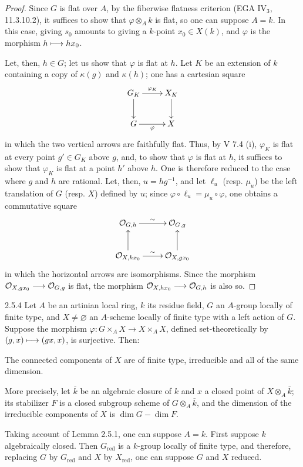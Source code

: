 \begin{proof}
Since $G$ is flat over $A$, by the fiberwise flatness criterion (EGA IV$_3$, 11.3.10.2), it suffices to show that $\varphi\otimes_Ak$ is flat, so one can suppose $A=k$. In this case, giving $s_0$ amounts to giving a $k$-point $x_0\in X(k)$, and $\varphi$ is the morphism $h\longmapsto hx_0$.

Let, then, $h\in G$; let us show that $\varphi$ is flat at $h$. Let $K$ be an extension of $k$ containing a copy of $\kappa(g)$ and $\kappa(h)$; one has a cartesian square
\[
\xymatrix{G_K\ar[r]^{\varphi_K}\ar[d]&X_K\ar[d]\\G\ar[r]_\varphi&X}
\]
in which the two vertical arrows are faithfully flat. Thus, by V 7.4 (i), $\varphi_K$ is flat at every point $g'\in G_K$ above $g$, and, to show that $\varphi$ is flat at $h$, it suffices to show that $\varphi_K$ is flat at a point $h'$ above $h$. One is therefore reduced to the case where $g$ and $h$ are rational. Let, then, $u=hg^{-1}$, and let $\ell_u$ (resp. $\mu_u$) be the left translation of $G$ (resp. $X$) defined by $u$; since $\varphi\circ\ell_u=\mu_u\circ\varphi$, one obtains a commutative square
\[
\xymatrix{\OO_{G,h}\ar[r]^\sim&\OO_{G,g}\\\OO_{X,hx_0}\ar[u]\ar[r]^\sim&\OO_{X,gx_0}\ar[u]}
\]
in which the horizontal arrows are isomorphisms. Since the morphism $\mathcal{O}_{X,gx_0}\longrightarrow\mathcal{O}_{G,g}$ is flat, the morphism $\mathcal{O}_{X,hx_0}\longrightarrow\mathcal{O}_{G,h}$ is also so.
\end{proof}
\begin{proposition}{2.5.4}\label{VIA.2.5.4}
Let $A$ be an artinian local ring, $k$ its residue field, $G$ an $A$-group locally of finite type, and $X\ne\varnothing$ an $A$-scheme locally of finite type with a left action of $G$. Suppose the morphism $\varphi:G\times_AX\to X\times_AX$, defined set-theoretically by $(g,x)\longmapsto(gx,x)$, is surjective. Then:
\begin{enumeratei}
\item The connected components of $X$ are of finite type, irreducible and all of the same dimension.
\item More precisely, let $\overline k$ be an algebraic closure of $k$ and $x$ a closed point of $X\otimes_A\overline k$; its stabilizer $F$ is a closed subgroup scheme of $G\otimes_A\overline k$, and the dimension of the irreducible components of $X$ is $\dim G-\dim F$.
\end{enumeratei}
\end{proposition}
Taking account of Lemma 2.5.1, one can suppose $A=k$. First suppose $k$ algebraically closed. Then $G_{\mathrm{red}}$ is a $k$-group locally of finite type, and therefore, replacing $G$ by $G_{\mathrm{red}}$ and $X$ by $X_{\mathrm{red}}$, one can suppose $G$ and $X$ reduced.

